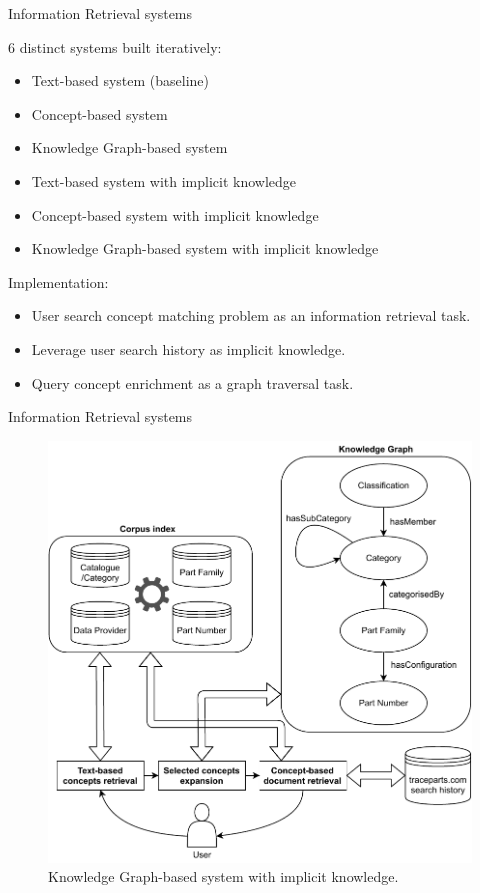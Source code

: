 \begin{frame}{Information Retrieval systems}

    6 distinct systems built iteratively:
    \begin{itemize}
        \item Text-based system (baseline)
        \item Concept-based system
        \item Knowledge Graph-based system
        \item Text-based system with implicit knowledge
        \item Concept-based system with implicit knowledge
        \item Knowledge Graph-based system with implicit knowledge
    \end{itemize}

    Implementation:
    \begin{itemize}
        \item User search concept matching problem as an information retrieval task.
        \item Leverage user search history as implicit knowledge.
        \item Query concept enrichment as a graph traversal task.
    \end{itemize}

\end{frame}

\begin{frame}{Information Retrieval systems}

    \begin{figure} [H]
        \begin{center}
            \includegraphics[scale=0.45]{images/kg-based-ir-system-with-search-hist.pdf} 
            \caption{Knowledge Graph-based system with implicit knowledge.} 
        \end{center}
    \end{figure}

\end{frame}


